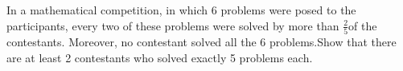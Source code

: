 
\item In a mathematical competition, in which 6 problems were posed to the participants, every two of these problems were solved by more than $\frac{2}{5}$of the contestants. Moreover, no contestant solved all the 6 problems.Show that there are at least 2 contestants who solved exactly 5 problems each.
